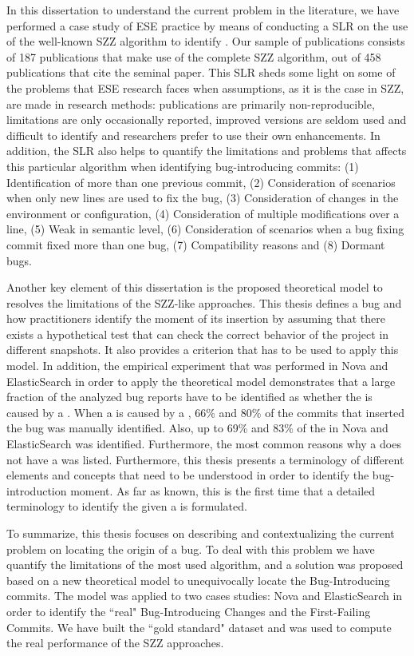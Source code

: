 \documentclass[a4paper, 12pt]{book}
\begin{document}
In this dissertation to understand the current problem in the literature,  we have performed a case study of ESE practice by means of conducting a SLR on the use of the well-known SZZ algorithm to identify \BIC. Our sample of publications consists of 187 publications that make use of the complete SZZ algorithm, out of 458 publications that cite the seminal paper. This SLR sheds some light on some of the problems that ESE research faces when assumptions, as it is the case in SZZ, are made in research methods: publications are primarily non-reproducible, limitations are only occasionally reported, improved versions are seldom used and difficult to identify and researchers prefer to use their own enhancements. In addition, the SLR also helps to quantify the limitations and problems that affects this particular algorithm when identifying bug-introducing commits: (1) Identification of more than one previous commit, (2) Consideration of scenarios when only new lines are used to fix the bug, (3) Consideration of changes in the environment or configuration, (4) Consideration of multiple modifications over a line, (5) Weak in semantic level, (6) Consideration of scenarios when a bug fixing commit fixed more than one bug, (7) Compatibility reasons and (8) Dormant bugs.

Another key element of this dissertation is the proposed theoretical model to resolves the limitations of the SZZ-like approaches. This thesis defines  a bug and how practitioners identify the moment of its insertion by assuming that there exists a hypothetical test that can check the correct behavior of the project in different snapshots. It also provides a criterion that has to be used to apply this model. In addition, the empirical experiment that was performed in Nova and ElasticSearch in order to apply the theoretical model demonstrates that a large fraction of the analyzed bug reports have to be identified as whether the \BFC is caused by a \BIC. When a \BFC is caused by a \BIC, 66\% and 80\% of the commits that inserted the bug was manually identified. Also, up to 69\% and 83\% of the \FFC in Nova and ElasticSearch was identified. Furthermore, the most common reasons why a \BFC does not have a \BIC was listed. Furthermore, this thesis presents a terminology of different elements and concepts that need to be understood in order to identify the bug-introduction moment. As far as known, this is the first time that a detailed terminology to identify the \BIC given a \BFC is formulated.

To summarize, this thesis focuses on describing and contextualizing the current problem on locating the origin of a bug. To deal with this problem we have quantify the limitations of the most used algorithm, and a solution was proposed based on a new theoretical model to unequivocally locate the Bug-Introducing commits. The model was applied to two cases  studies: Nova and ElasticSearch in order to identify the ``real" Bug-Introducing Changes and the First-Failing Commits.  We have built the ``gold standard" dataset and was used to compute the real performance of the SZZ approaches.  
\end{document}
